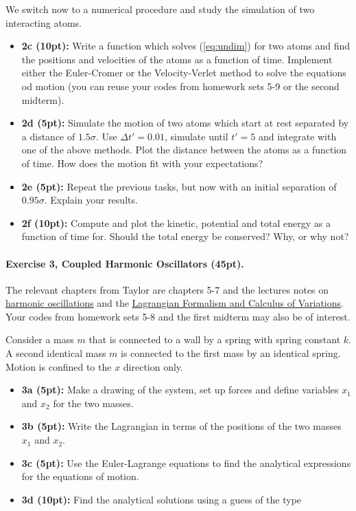 \documentclass[%
oneside,                 %
final,                   %
10pt]{article}
\begin{document}
\noindent
We switch now to a numerical procedure and study the simulation of two interacting atoms.
\begin{itemize}
\item \textbf{2c (10pt):} Write a function which solves (\ref{eq:undim}) for two atoms and find the positions and velocities of the atoms as a function of time. Implement either the Euler-Cromer or the Velocity-Verlet method to solve the equations od motion (you can reuse your codes from homework sets 5-9 or the second midterm).

\item \textbf{2d (5pt):} Simulate the motion of two atoms which start at rest separated by a distance of ${1.5}\sigma$. Use $\Delta t'={0.01}$, simulate until $t'=5$ and integrate with one of the above methods. Plot the distance between the atoms as a function of time. How does the motion fit with your expectations?

\item \textbf{2e (5pt):} Repeat the previous tasks, but now with an initial separation of $0.95\sigma$. Explain your results.

\item \textbf{2f (10pt):} Compute and plot the kinetic, potential and total energy as a function of time for. Should the total energy be conserved? Why, or why not? 
\end{itemize}

\noindent
\paragraph{Exercise 3, Coupled Harmonic Oscillators (45pt).}
The relevant chapters from Taylor are chapters 5-7 and the lectures notes on \href{{https://mhjensen.github.io/Physics321/doc/LectureNotes/_build/html/chapter5.html}}{harmonic oscillations} and the \href{{https://mhjensen.github.io/Physics321/doc/LectureNotes/_build/html/chapter8.html}}{Lagrangian Formalism and Calculus of Variations}. Your codes from homework sets 5-8 and the first midterm may also be of interest.

Consider a mass $m$ that is connected to a wall by a spring with
spring constant $k$. A second identical mass $m$ is connected to the
first mass by an identical spring. Motion is confined to the $x$ direction only.

\begin{itemize}
\item \textbf{3a (5pt):} Make a drawing of the system, set up forces and define variables $x_1$ and $x_2$ for the two masses.

\item \textbf{3b (5pt):} Write the Lagrangian in terms of the positions of the two masses $x_1$ and $x_2$.

\item \textbf{3c (5pt):} Use the Euler-Lagrange equations to find the analytical expressions for the  equations of motion.

\item \textbf{3d (10pt):} Find the analytical  solutions using a guess of  the type
\end{itemize}
\end{document}
